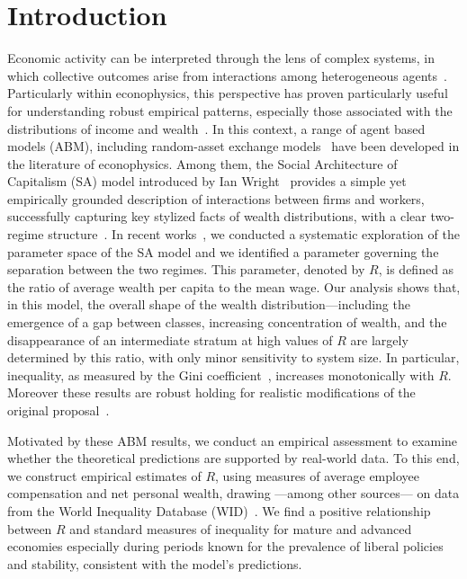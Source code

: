 \documentclass[12pt]{article}
\begin{document}
 \section{Introduction} 
\label{sec:introduction}
Economic activity can be interpreted through the lens of complex systems, in which collective outcomes arise from  interactions among heterogeneous agents~\cite{JUSUP20221,yakovenko2009,Farmer2009}. Particularly within econophysics, this perspective has proven particularly useful for understanding robust empirical patterns, especially those associated with the distributions of income and wealth~\cite{yakovenko2009,shaikh}.  In this context, a range of agent based models (ABM), including random-asset exchange models~\cite{chatterjee2007econophysics,repec:spr:eurphb:v:73:y:2010:i:1:p:145-153} have been developed in the literature of econophysics. Among them, the Social Architecture of Capitalism (SA) model introduced by Ian Wright~\cite{WRIGHT2005589} provides a simple yet empirically grounded description of interactions between firms and workers, successfully capturing key stylized facts of wealth distributions, with a clear two-regime structure~\cite{dragulescu2001,yakovenko2023}.
%
In recent works~\cite{Borba2025,Borba2026}, we conducted a systematic exploration of the parameter space of the SA model and we identified a parameter governing the separation between the two regimes.
This parameter, denoted by $R$, is defined as the ratio of average wealth per capita to the mean wage. Our analysis shows that, in this model, the overall shape of the wealth distribution—including the emergence of a gap between classes, increasing concentration of wealth, and the disappearance of an intermediate stratum at high values of $R$ are largely determined by this ratio, with only minor sensitivity to system size. In particular, inequality, as measured by the Gini coefficient~\cite{PLATAPEREZ201579}, increases monotonically with $R$. 
Moreover these results are robust holding for realistic modifications of the original proposal~\cite{Borba2026}.

Motivated by these ABM results, we conduct an empirical assessment to examine whether the theoretical predictions are supported by real-world data. 
%
To this end, we construct  empirical estimates of $R$, using measures of average employee compensation and net personal wealth, drawing —among other sources— on data from the World Inequality Database (WID)~\cite{WID}. We find a positive relationship between $R$ and standard measures of inequality   for mature and advanced economies especially during periods known for the prevalence of liberal policies and stability, consistent with the model’s predictions.
\end{document}
